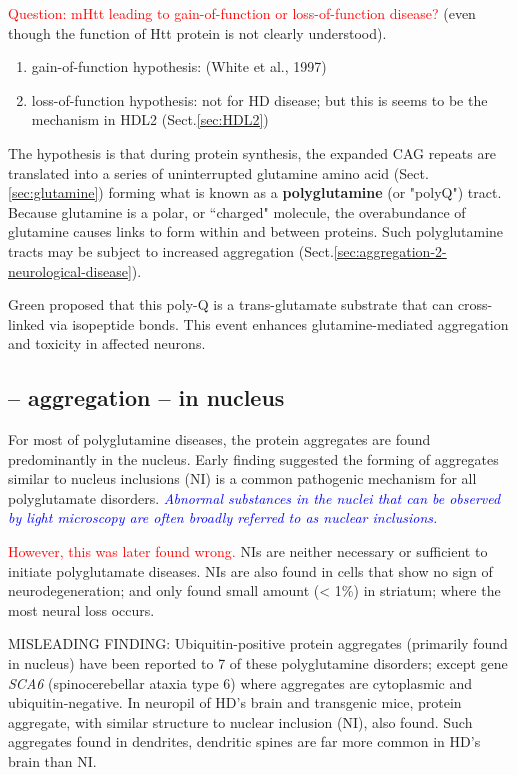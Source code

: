 \begin{mdframed}
\textcolor{red}{Question: mHtt leading to gain-of-function or loss-of-function
disease?} (even though the function of Htt protein is not clearly understood).

\begin{enumerate}
  \item gain-of-function hypothesis: (White et al., 1997)
  
  \item loss-of-function hypothesis: not for HD disease; but this is seems to be
  the mechanism in HDL2 (Sect.\ref{sec:HDL2})
\end{enumerate}
\end{mdframed}

The hypothesis is that during protein synthesis, the expanded CAG repeats are
translated into a series of uninterrupted glutamine amino acid
(Sect.\ref{sec:glutamine}) forming what is known as a {\bf polyglutamine} (or
"polyQ") tract. Because glutamine is a polar, or ``charged" molecule, the
overabundance of glutamine causes links to form within and between proteins.
Such polyglutamine tracts may be subject to increased aggregation
(Sect.\ref{sec:aggregation-2-neurological-disease}).

Green proposed that this poly-Q is a trans-glutamate substrate that can
cross-linked via isopeptide bonds. This event enhances glutamine-mediated
aggregation and toxicity in affected neurons. 

\subsection{-- aggregation -- in nucleus}
\label{sec:HD-theory-mHTT-aggregation-in-nucleus}

For most of polyglutamine diseases, the protein aggregates are found
predominantly in the nucleus. Early finding suggested the forming of aggregates
similar to nucleus inclusions (NI) is a common pathogenic mechanism for all
polyglutamate disorders. \textcolor{blue}{\it Abnormal substances in the nuclei
that can be observed by light microscopy are often broadly referred to as
nuclear inclusions. }

\textcolor{red}{However, this was later found wrong.} NIs are neither necessary
or sufficient to initiate polyglutamate diseases. NIs are also found in cells
that show no sign of neurodegeneration; and only found small amount (< 1\%) in
striatum; where the most neural loss occurs.

\begin{mdframed}

MISLEADING FINDING: Ubiquitin-positive protein aggregates (primarily found in
nucleus) have been reported to 7 of these polyglutamine disorders; except gene
{\it SCA6} (spinocerebellar ataxia type 6) where aggregates are cytoplasmic and
ubiquitin-negative. In neuropil of HD's brain and transgenic mice, protein
aggregate, with similar structure to nuclear inclusion (NI), also found. Such
aggregates found in dendrites, dendritic spines are far more common in HD's
brain than NI.

\end{mdframed}

